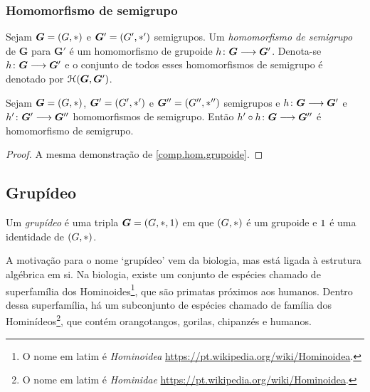 \subsubsection{Homomorfismo de semigrupo}

\begin{definition}
Sejam $\bm G=(G,\ast)$ e $\bm G'=(G',\ast')$ semigrupos. Um \emph{homomorfismo de semigrupo} de $\bm G$ para $\bm G'$ é um homomorfismo de grupoide ${h}\colon {\bm G} \longrightarrow {\bm G'}$. Denota-se ${h}\colon {\bm G} \longrightarrow {\bm G'}$ e o conjunto de todos esses homomorfismos de semigrupo é denotado por $\mathcal{H}(\bm G,\bm G')$.
\end{definition}

\begin{proposition}
\label{comp.hom.sem}
Sejam $\bm G=(G,\ast)$, $\bm G'=(G',\ast')$ e $\bm G''=(G'',\ast'')$ semigrupos e ${h}\colon {\bm G } \longrightarrow {\bm G'}$ e ${h'}\colon {\bm G'} \longrightarrow {\bm G''}$ homomorfismos de semigrupo. Então ${h' \circ h}\colon {\bm G} \longrightarrow {\bm G''}$ é homomorfismo de semigrupo.
\end{proposition}
\begin{proof}
A mesma demonstração de \ref{comp.hom.grupoide}.
\end{proof}




\subsection{Grupídeo}

\begin{definition}
Um \emph{grupídeo} é uma tripla $\bm G = (G,\ast,1)$ em que $(G,\ast)$ é um grupoide e $1$ é uma identidade de $(G,\ast)$.
\end{definition}

A motivação para o nome `grupídeo' vem da biologia, mas está ligada à estrutura algébrica em si. Na biologia, existe um conjunto de espécies chamado de superfamília dos Hominoides\footnote{O nome em latim é \textit{Hominoidea} \url{https://pt.wikipedia.org/wiki/Hominoidea}.}, que são primatas próximos aos humanos. Dentro dessa superfamília, há um subconjunto de espécies chamado de família dos Hominídeos\footnote{O nome em latim é \textit{Hominidae} \url{https://pt.wikipedia.org/wiki/Hominoidea}.}, que contém orangotangos, gorilas, chipanzés e humanos.

